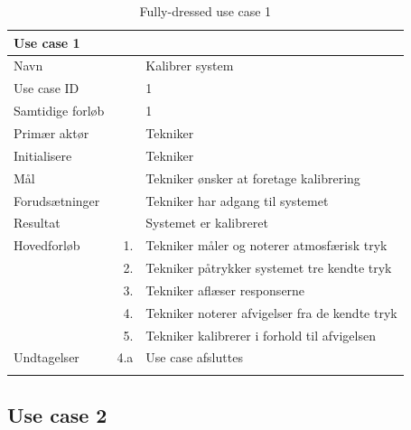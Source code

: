\begin{longtabu} to  %
    {\large \textbf{Use case 1}} && \\
    \toprule
    Navn &&    Kalibrer system\\
    Use case ID &&    1\\
    Samtidige forløb &&    1\\
    Primær aktør &&    Tekniker\\
    Initialisere &&    Tekniker\\
    Mål && Tekniker ønsker at foretage kalibrering\\
    Forudsætninger &&  Tekniker har adgang til systemet\\
    Resultat &&    Systemet er kalibreret                     \\ \midrule
    Hovedforløb &    1. &    Tekniker måler og noterer atmosfærisk tryk \\
    			&    2. &    Tekniker påtrykker systemet tre kendte tryk  \\
    			&    3. &    Tekniker aflæser responserne  \\ 
    			&    4. &    Tekniker noterer afvigelser fra de kendte tryk   \\
    			&    5. &    Tekniker kalibrerer i forhold til afvigelsen  \\ \midrule 		
    Undtagelser &    4.a & Use case afsluttes \\ \bottomrule
\caption{Fully-dressed use case 1}
\label{UC1}
\end{longtabu}

\subsection{Use case 2}

